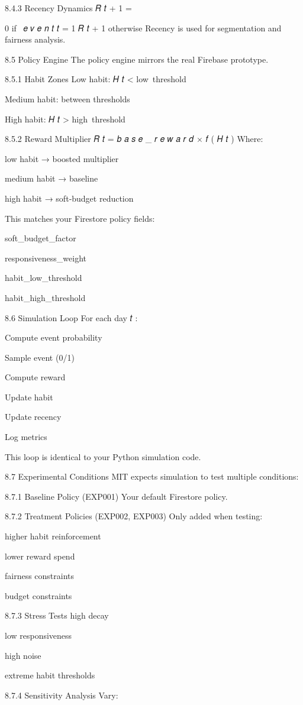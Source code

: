 8.4.3 Recency Dynamics
𝑅
𝑡
+
1
=
{
0
if 
𝑒
𝑣
𝑒
𝑛
𝑡
𝑡
=
1
𝑅
𝑡
+
1
otherwise
Recency is used for segmentation and fairness analysis.

8.5 Policy Engine
The policy engine mirrors the real Firebase prototype.

8.5.1 Habit Zones
Low habit: 
𝐻
𝑡
<
low threshold

Medium habit: between thresholds

High habit: 
𝐻
𝑡
>
high threshold

8.5.2 Reward Multiplier
𝑅
𝑡
=
𝑏
𝑎
𝑠
𝑒
_
𝑟
𝑒
𝑤
𝑎
𝑟
𝑑
×
𝑓
(
𝐻
𝑡
)
Where:

low habit → boosted multiplier

medium habit → baseline

high habit → soft‑budget reduction

This matches your Firestore policy fields:

soft_budget_factor

responsiveness_weight

habit_low_threshold

habit_high_threshold

8.6 Simulation Loop
For each day 
𝑡
:

Compute event probability

Sample event (0/1)

Compute reward

Update habit

Update recency

Log metrics

This loop is identical to your Python simulation code.

8.7 Experimental Conditions
MIT expects simulation to test multiple conditions:

8.7.1 Baseline Policy (EXP001)
Your default Firestore policy.

8.7.2 Treatment Policies (EXP002, EXP003)
Only added when testing:

higher habit reinforcement

lower reward spend

fairness constraints

budget constraints

8.7.3 Stress Tests
high decay

low responsiveness

high noise

extreme habit thresholds

8.7.4 Sensitivity Analysis
Vary:

}
